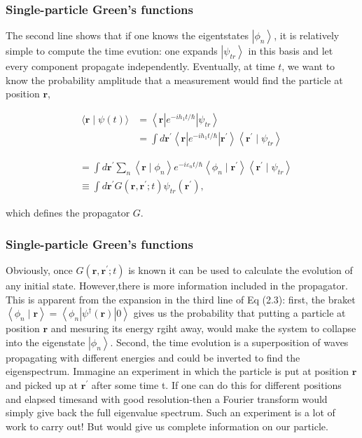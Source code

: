 \documentclass[compress]{beamer}
\begin{document}
\frame
{
\frametitle{Single-particle Green's functions}
\begin{small}
{\scriptsize
The second line shows that if one knows the eigentstates $\left|\phi_{n}\right\rangle$, it is relatively simple to compute the time evution: one expands $\left|\psi_{t r}\right\rangle$ in this basis and let every component propagate independently. Eventually, at time $t$, we want to know the probability amplitude that a measurement would find the particle at position $\mathbf{r}$,

$$
\begin{aligned}
\langle\mathbf{r} \mid \psi(t)\rangle & =\left\langle\mathbf{r}\left|e^{-i h_{1} t / \hbar}\right| \psi_{t r}\right\rangle \\
& =\int d \mathbf{r}^{\prime}\left\langle\mathbf{r}\left|e^{-i h_{1} t / \hbar}\right| \mathbf{r}^{\prime}\right\rangle\left\langle\mathbf{r}^{\prime} \mid \psi_{t r}\right\rangle
\end{aligned}
$$

$$
\begin{aligned}
& =\int d \mathbf{r}^{\prime} \sum_{n}\left\langle\mathbf{r} \mid \phi_{n}\right\rangle e^{-i \varepsilon_{n} t / \hbar}\left\langle\phi_{n} \mid \mathbf{r}^{\prime}\right\rangle\left\langle\mathbf{r}^{\prime} \mid \psi_{t r}\right\rangle \\
& \equiv \int d \mathbf{r}^{\prime} G\left(\mathbf{r}, \mathbf{r}^{\prime} ; t\right) \psi_{t r}\left(\mathbf{r}^{\prime}\right),
\end{aligned}
$$

which defines the propagator $G$.
}
\end{small}
}


\frame
{
\frametitle{Single-particle Green's functions}
\begin{small}
{\scriptsize
 Obviously, once $G\left(\mathbf{r}, \mathbf{r}^{\prime} ; t\right)$
 is known it can be used to calculate the evolution of any initial
 state. However,there is more information included in the
 propagator. This is apparent from the expansion in the third line of
 Eq (2.3): first, the braket $\left\langle\phi_{n} \mid
 \mathbf{r}\right\rangle=\left\langle\phi_{n}\left|\psi^{\dagger}(\mathbf{r})\right|
 0\right\rangle$ gives us the probability that putting a particle at
 position $\mathbf{r}$ and mesuring its energy rgiht away, would make
 the system to collapse into the eigenstate
 $\left|\phi_{n}\right\rangle$. Second, the time evolution is a
 superposition of waves propagating with different energies and could
 be inverted to find the eigenspectrum. Immagine an experiment in
 which the particle is put at position $\mathbf{r}$ and picked up at
 $\mathbf{r}^{\prime}$ after some time t. If one can do this for
 different positions and elapsed timesand with good resolution-then a
 Fourier transform would simply give back the full eigenvalue
 spectrum. Such an experiment is a lot of work to carry out! But would
 give us complete information on our particle.

}
\end{small}
}
\end{document}
